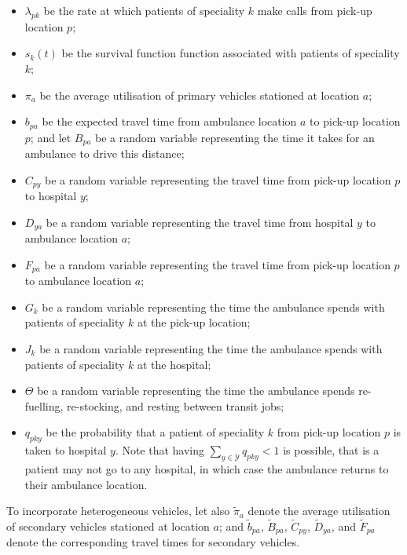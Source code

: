 \documentclass[numbers,webpdf,imaman]{ima-authoring-template}%
\begin{document}
\begin{itemize}
  \item $\lambda_{pk}$ be the rate at which patients of speciality $k$ make
        calls from pick-up location $p$;
  \item $s_k(t)$ be the survival function function associated with patients of
        speciality $k$;
  \item $\pi_a$ be the average utilisation of primary vehicles stationed at
        location $a$;
  \item $b_{pa}$ be the expected travel time from ambulance location $a$ to
        pick-up location $p$; and let $B_{pa}$ be a random variable representing
        the time it takes for an ambulance to drive this distance;
  \item $C_{py}$ be a random variable representing the travel time from pick-up
        location $p$ to hospital $y$;
  \item $D_{ya}$ be a random variable representing the travel time from hospital
        $y$ to ambulance location $a$;
  \item $F_{pa}$ be a random variable representing the travel time from pick-up
        location $p$ to ambulance location $a$;
  \item $G_k$ be a random variable representing the time the ambulance spends
        with patients of speciality $k$ at the pick-up location;
  \item $J_k$ be a random variable representing the time the ambulance spends
        with patients of speciality $k$ at the hospital;
  \item $\Theta$ be a random variable representing the time the ambulance spends
        re-fuelling, re-stocking, and resting between transit jobs;
  \item $q_{pky}$ be the probability that a patient of speciality $k$ from
        pick-up location $p$ is taken to hospital $y$.
        Note that having $\sum_{y \in \mathcal{Y}} q_{pky} < 1$ is possible, that is a
        patient may not go to any hospital, in which case the ambulance returns
        to their ambulance location.
\end{itemize}

To incorporate heterogeneous vehicles, let also $\tilde{\pi}_a$ denote the
average utilisation of secondary vehicles stationed at location $a$; and
$\tilde{b}_{pa}$, $\tilde{B}_{pa}$, $\tilde{C}_{py}$, $\tilde{D}_{ya}$, and
$\tilde{F}_{pa}$ denote the corresponding travel times for secondary vehicles.
\end{document}
